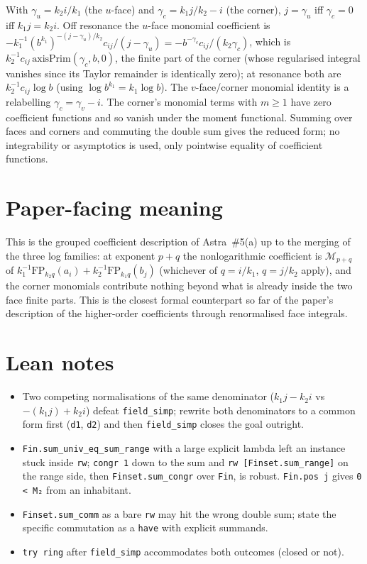 \documentclass[11pt]{article}
\begin{document}
With $\gamma_u=k_2i/k_1$ (the $u$-face) and $\gamma_c=k_1j/k_2-i$ (the corner), $j=\gamma_u$ iff
$\gamma_c=0$ iff $k_1j=k_2i$. Off resonance the $u$-face monomial coefficient is
$-k_1^{-1}(b^{k_1})^{-(j-\gamma_u)/k_2}c_{ij}/(j-\gamma_u)=-b^{-\gamma_c}c_{ij}/(k_2\gamma_c)$,
which is $k_2^{-1}c_{ij}\,\mathrm{axisPrim}(\gamma_c,b,0)$, the finite part of the corner (whose
regularised integral vanishes since its Taylor remainder is identically zero); at resonance both are
$k_2^{-1}c_{ij}\log b$ (using $\log b^{k_1}=k_1\log b$). The $v$-face/corner monomial identity is a
relabelling $\gamma_c=\gamma_v-i$. The corner's monomial terms with $m\ge1$ have zero coefficient
functions and so vanish under the moment functional. Summing over faces and corners and commuting
the double sum gives the reduced form; no integrability or asymptotics is used, only pointwise
equality of coefficient functions.

\section{Paper-facing meaning}

This is the grouped coefficient description of Astra~\#5(a) up to the merging of the three log
families: at exponent $p+q$ the nonlogarithmic coefficient is $\mathcal M_{p+q}$ of
$k_1^{-1}\mathrm{FP}_{k_2q}(a_i)+k_2^{-1}\mathrm{FP}_{k_1q}(b_j)$ (whichever of $q=i/k_1$,
$q=j/k_2$ apply), and the corner monomials contribute nothing beyond what is already inside the two
face finite parts. This is the closest formal counterpart so far of the paper's description of the
higher-order coefficients through renormalised face integrals.

\section{Lean notes}

\begin{itemize}
\item Two competing normalisations of the same denominator ($k_1j-k_2i$ vs $-(k_1j)+k_2i$) defeat
\texttt{field\_simp}; rewrite both denominators to a common form first
(\texttt{d1}, \texttt{d2}) and then \texttt{field\_simp} closes the goal outright.
\item \texttt{Fin.sum\_univ\_eq\_sum\_range} with a large explicit lambda left an instance stuck
inside \texttt{rw}; \texttt{congr 1} down to the sum and \texttt{rw [Finset.sum\_range]} on the
range side, then \texttt{Finset.sum\_congr} over \texttt{Fin}, is robust. \texttt{Fin.pos j} gives
\texttt{0 < M₂} from an inhabitant.
\item \texttt{Finset.sum\_comm} as a bare \texttt{rw} may hit the wrong double sum; state the
specific commutation as a \texttt{have} with explicit summands.
\item \texttt{try ring} after \texttt{field\_simp} accommodates both outcomes (closed or not).
\end{itemize}
\end{document}
